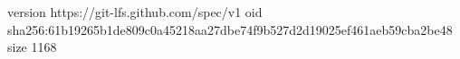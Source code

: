 version https://git-lfs.github.com/spec/v1
oid sha256:61b19265b1de809c0a45218aa27dbe74f9b527d2d19025ef461aeb59cba2be48
size 1168
